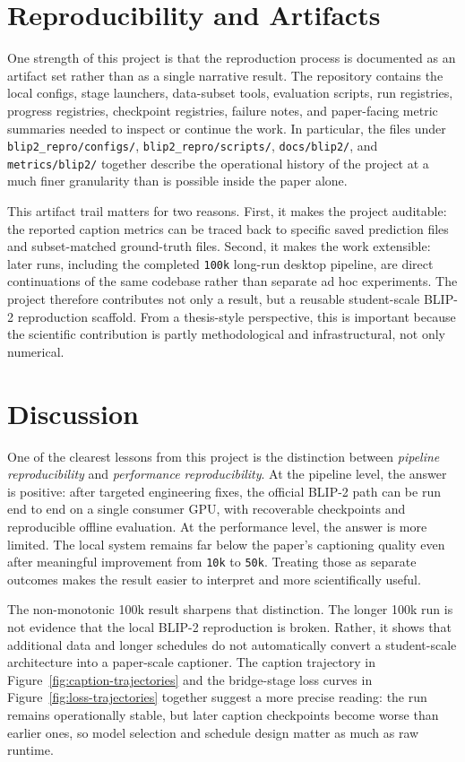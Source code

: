 \documentclass[11pt]{article}
\begin{document}
\section{Reproducibility and Artifacts}
One strength of this project is that the reproduction process is documented as an artifact set rather than as a single narrative result. The repository contains the local configs, stage launchers, data-subset tools, evaluation scripts, run registries, progress registries, checkpoint registries, failure notes, and paper-facing metric summaries needed to inspect or continue the work. In particular, the files under \texttt{blip2\_repro/configs/}, \texttt{blip2\_repro/scripts/}, \texttt{docs/blip2/}, and \texttt{metrics/blip2/} together describe the operational history of the project at a much finer granularity than is possible inside the paper alone.

This artifact trail matters for two reasons. First, it makes the project auditable: the reported caption metrics can be traced back to specific saved prediction files and subset-matched ground-truth files. Second, it makes the work extensible: later runs, including the completed \texttt{100k} long-run desktop pipeline, are direct continuations of the same codebase rather than separate ad hoc experiments. The project therefore contributes not only a result, but a reusable student-scale BLIP-2 reproduction scaffold. From a thesis-style perspective, this is important because the scientific contribution is partly methodological and infrastructural, not only numerical.

\section{Discussion}
One of the clearest lessons from this project is the distinction between \emph{pipeline reproducibility} and \emph{performance reproducibility}. At the pipeline level, the answer is positive: after targeted engineering fixes, the official BLIP-2 path can be run end to end on a single consumer GPU, with recoverable checkpoints and reproducible offline evaluation. At the performance level, the answer is more limited. The local system remains far below the paper's captioning quality even after meaningful improvement from \texttt{10k} to \texttt{50k}. Treating those as separate outcomes makes the result easier to interpret and more scientifically useful.

The non-monotonic 100k result sharpens that distinction. The longer 100k run is not evidence that the local BLIP-2 reproduction is broken. Rather, it shows that additional data and longer schedules do not automatically convert a student-scale architecture into a paper-scale captioner. The caption trajectory in Figure~\ref{fig:caption-trajectories} and the bridge-stage loss curves in Figure~\ref{fig:loss-trajectories} together suggest a more precise reading: the run remains operationally stable, but later caption checkpoints become worse than earlier ones, so model selection and schedule design matter as much as raw runtime.
\end{document}
